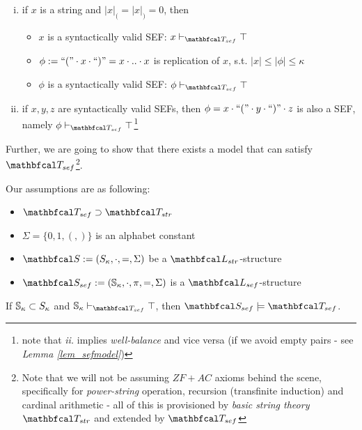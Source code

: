 \begin{definition}
\begin{enumerate}
    \begin{enumerate}[i.)]
      \item if $x$ is a string and $|x|_{(} = |x|_{)} = 0$, then 
      \begin{itemize}
        \item $x$ is a syntactically valid SEF: $x \vdash_{\LsT_{sef}} \top$ 
        \item $\phi := \text{``}(\text{''} \cdot x \cdot \text{``})\text{''} = x \cdot .. \cdot x$ is replication of $x$, s.t. $|x| \leq |\phi| \leq \kappa$
        \item $\phi$ is a syntactically valid SEF: $\phi \vdash_{\LsT_{sef}} \top$
      \end{itemize}
      \item if $x,y,z$ are syntactically valid SEFs, then $\phi = x \cdot \text{``}(\text{''} \cdot y \cdot \text{``})\text{''} \cdot z$ is also a SEF, namely $\phi \vdash_{\LsT_{sef}} \top$\footnote{note that \textit{ii.} implies \textit{well-balance} and vice versa (if we avoid empty pairs - see \textit{Lemma \ref{lem_sefmodel}})}
    \end{enumerate}
  \end{enumerate}
\end{definition}

Further, we are going to show that there exists a model that can satisfy $\LsT_{sef}$\footnote{Note that we will not be  assuming $ZF+AC$ axioms behind the scene, specifically for \textit{power-string} operation, recursion (transfinite induction) and cardinal arithmetic - all of this is provisioned by \textit{basic string theory} $\LsT_{str}$ and extended by $\LsT_{sef}$}.

\begin{lemma}\label{lem_sefmodel}
  Our assumptions are as following:
  \begin{itemize}
    \item $\LsT_{sef} \supset \LsT_{str}$
    \item $\Sigma = \{0,1,(,)\}$ is an alphabet constant
    \item $\LsS := (S_{\kappa},\cdot,=,\Sigma)$ be a $\lsign_{str}$-structure
    \item $\LsS_{sef} := (\vsef_{\kappa},\cdot,\pi,=,\Sigma)$ is a $\lsign_{sef}$-structure
  \end{itemize}
  
  If $\mathbb{S}_{\kappa} \subset S_{\kappa}$ and $\vsef_{\kappa} \vdash_{\LsT_{sef}} \top$, then $\LsS_{sef} \models \LsT_{sef}$.
\end{lemma}
  
